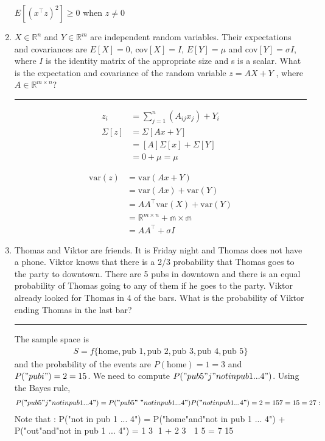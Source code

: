\documentclass[12pt]{article}
\begin{document}
\begin{enumerate}
    $E[(x^\intercal z)^2] \geq 0$ when $z \neq 0$

    \item $X \in \mathbb{R}^n$ and $Y \in \mathbb{R}^m$ are independent random variables. Their expectations and covariances are $E[X]=0$, $\textrm{cov}[X] = I$, $E[Y] = \mu$ and $\textrm{cov}[Y] = \sigma I$, 
        where $I$ is the identity matrix of the appropriate size and s is a scalar. What is the expectation and covariance of the random variable $z = AX + Y$ , where $A \in \mathbb{R}^{m \times n}$? 
    
    \noindent\rule{\linewidth}{1pt}

    \begin{align*}
        z_i &= \sum_{j=1}^{n}(A_{ij}x_j) + Y_i \\
        \Sigma[z] &= \Sigma[Ax+Y] \\
        &=  [A] \Sigma[x] + \Sigma[Y] \\
        &= 0 + \mu = \mu
    \end{align*}

    \begin{align*}
        \textrm{var}(z) &= \textrm{var}(Ax+Y) \\
                        &= \textrm{var}(Ax) + \textrm{var}(Y) \\
                        &= AA^\intercal \textrm{var}(X) + \textrm{var}(Y) \\
                        &= \mathbb{R}^{m \times n} + \mathbb{m \times m} \\
                        &= AA^\intercal + \sigma I
    \end{align*}
    
    \item Thomas and Viktor are friends. It is Friday night and Thomas does not have a phone. Viktor knows that there is a 2/3 probability that Thomas goes to the party to downtown. 
          There are 5 pubs in downtown and there is an equal probability of Thomas going to any of them if he goes to the party. Viktor already looked for Thomas in 4 of the bars. 
          What is the probability of Viktor ending Thomas in the last bar? 
    
    \noindent\rule{\linewidth}{1pt}

    The sample space is
    \begin{align*}
        S = f\{\textrm{home}, \textrm{pub 1}, \textrm{pub 2}, \textrm{pub 3}, \textrm{pub 4}, \textrm{pub 5}\}
    \end{align*}
    and the probability of the events are $P(\textrm{home}) = 1=3$ and $P("pub i") = 2=15$. We need to compute $P("pub 5"j"not in pub 1 ... 4")$.
    Using the Bayes rule,
    \begin{align*}
    P("pub 5"j"not in pub 1 ... 4") =
    P("pub 5" \ "not in pub 1 ... 4")
    P("not in pub 1 ... 4")
    =
    2=15
    7=15
    =
    2
    7
    :
    \end{align*}
    Note that :
    P("not in pub 1 ... 4") = P("home"and"not in pub 1 ... 4") + P("out"and"not in pub 1 ... 4") =
    1
    3
     1 +
    2
    3
    
    1
    5
    =
    7
    15


\end{enumerate}
\end{document}
